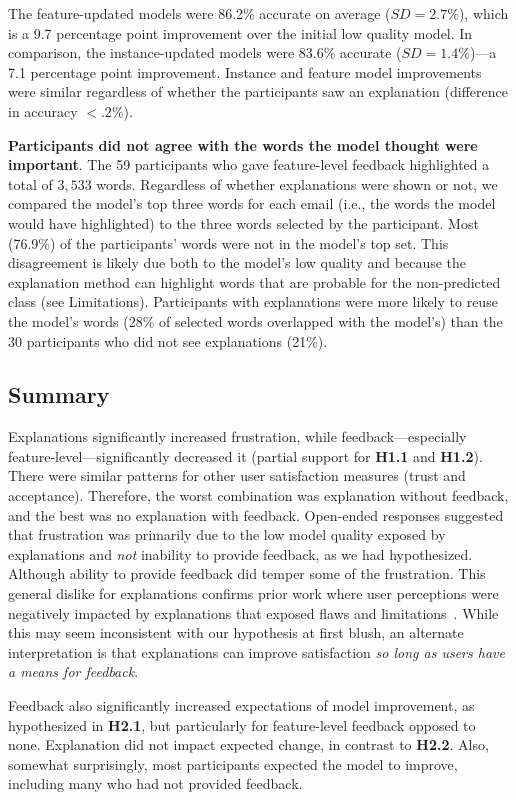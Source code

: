 The feature-updated models were 86.2\% accurate on average ($SD=2.7\%$), which is a 9.7 percentage point improvement over the initial low quality model.
In comparison, the instance-updated models were 83.6\% accurate ($SD=1.4\%$)---a 7.1 percentage point improvement. Instance and feature model improvements were similar regardless of whether the participants saw an explanation (difference in accuracy $<.2\%$).

\textbf{Participants did not agree with the words the model thought were important}.
The 59 participants who gave feature-level feedback highlighted a total of $3,533$ words. Regardless of whether explanations were shown or not, we compared the model's top three words for each email (i.e., the words the model would have highlighted) to the three words selected by the participant. Most (76.9\%) of the participants' words were not in the model's top set. This disagreement is likely due both to the model's low quality and because the explanation method can highlight words that are probable for the non-predicted class (see Limitations). Participants with explanations were more likely to reuse the model's words (28\% of selected words overlapped with the model's) than the 30 participants who did not see explanations (21\%).  

\subsection{Summary}
Explanations significantly increased frustration, while feedback---especially feature-level---significantly decreased it (partial support for \textbf{H1.1} and \textbf{H1.2}). There were similar patterns for other user satisfaction measures (trust and acceptance). Therefore, the worst combination was explanation without feedback, and the best was no explanation with feedback. Open-ended responses suggested that frustration was primarily due to the low model quality exposed by explanations and \textit{not} inability to provide feedback, as we had hypothesized. Although ability to provide feedback did temper some of the frustration. This general dislike for explanations confirms prior work where user perceptions were negatively impacted by explanations that exposed flaws and limitations~\cite{Cai2019TheInterface}. While this may seem inconsistent with our hypothesis at first blush, an alternate interpretation is that explanations can improve satisfaction \emph{so long as users have a means for feedback}. 

Feedback also significantly increased expectations of model improvement, as hypothesized in \textbf{H2.1}, but particularly for feature-level feedback opposed to none. Explanation did not impact expected change, in contrast to \textbf{H2.2}.
Also, somewhat surprisingly, most participants expected the model to improve, including many who had not provided feedback. %
